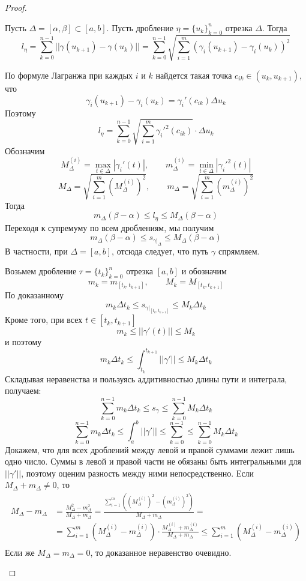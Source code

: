 \begin{proof}
	\begin{MyList}
		\item Пусть $\Delta = [\alpha, \beta] \subset [a, b]$. Пусть дробление $\eta = \{u_k\}_{k = 0}^n$ отрезка $\Delta$. 
		Тогда
		\[l_\eta = \sum_{k=0}^{n - 1} ||\gamma(u_{k + 1}) - \gamma(u_k)|| = \sum_{k=0}^{n - 1} \sqrt{\sum_{i=1}^{m} \left(\gamma_i(u_{k + 1}) - \gamma_i(u_k)\right)^2}\]  

		По формуле Лагранжа при каждых $i$ и $k$ найдется такая точка $c_{ik} \in (u_k, u_{k + 1})$, что
		\[\gamma_i (u_{k + 1}) - \gamma_i (u_k) = \gamma_i' (c_{ik}) \Delta u_k\]
		Поэтому
		\[l_\eta = \sum_{k=0}^{n - 1} \sqrt{\sum_{i=1}^{m} \gamma_i'^2 (c_{ik})} \cdot \Delta u_k\]
		Обозначим 
		\[M_\Delta^{(i)} = \max_{t \in \Delta} |\gamma_i'(t)|, \qquad m_\Delta^{(i)} = \min_{t \in \Delta} |\gamma_i'^2 (t)|\]
		\[M_\Delta = \sqrt{\sum_{i=1}^{m} \left(M_\Delta^{(i)}\right)^2}, \qquad m_\Delta = \sqrt{\sum_{i=1}^{m} \left(m_\Delta^{(i)}\right)^2}\]
		Тогда
		\[m_\Delta (\beta - \alpha) \leqslant l_\eta \leqslant M_\Delta (\beta - \alpha)\]
		Переходя к супремуму по всем дроблениям, мы получим
		\[m_\Delta (\beta - \alpha) \leqslant s_{\gamma |_\Delta} \leqslant M_\Delta (\beta - \alpha)\]
		В частности, при $\Delta = [a, b]$, отсюда следует, что путь $\gamma$ спрямляем.

		\item Возьмем дробление $\tau = \{t_k\}_{k = 0}^n$ отрезка $[a, b]$ и обозначим
		\[m_k = m_{[t_k, t_{k + 1}]}, \qquad M_k = M_{[t_k, t_{k + 1}]}\]
		По доказанному
		\[m_k \Delta t_k \leqslant s_{\gamma |_{[t_k, t_{k + 1}]}} \leqslant M_k \Delta t_k\]
		Кроме того, при всех $t \in [t_k, t_{k + 1}]$
		\[m_k \leqslant ||\gamma'(t)|| \leqslant M_k\]	
		и поэтому
		\[m_k \Delta t_k \leqslant \int_{t_k}^{t_{k + 1}} ||\gamma'|| \leqslant M_k \Delta t_k\]
		Складывая неравенства и пользуясь аддитивностью длины пути и интеграла, получаем:
		\[\sum_{k=0}^{n - 1} m_k \Delta t_k \leqslant s_\gamma \leqslant \sum_{k=0}^{n - 1} M_k \Delta t_k\]
		\[\sum_{k=0}^{n - 1} m_k \Delta t_k \leqslant \int_a^b ||\gamma'|| \leqslant \sum_{k=0}^{n - 1} \leqslant \sum_{k=0}^{n - 1} M_k \Delta t_k\]
		Докажем, что для всех дроблений между левой и правой суммами лежит лишь одно число.
		Суммы в левой и правой части не обязаны быть интегральными для $||\gamma'||$, поэтому оценим разность между ними непосредственно.
		Если $M_\Delta + m_\Delta \neq 0$, то 
		\begin{align*}
			M_\Delta - m_\Delta &= \frac{M_\Delta^2 - m_\Delta^2}{M_\Delta + m_\Delta} = \frac{\sum_{i = 1}^m \left(\left(M_\Delta^{(i)}\right)^2 - \left(m_\Delta^{(i)}\right)^2\right)}{M_\Delta + m_\Delta} = \\
			&= \sum_{i=1}^{m} \left(M_\Delta^{(i)} - m_\Delta^{(i)}\right) \cdot \frac{M_\Delta^{(i)} + m_\Delta^{(i)}}{M_\Delta + m_\Delta} \leqslant \sum_{i=1}^{m} \left(M_\Delta^{(i)} - m_\Delta^{(i)}\right) \\
		\end{align*}
		Если же $M_\Delta = m_\Delta = 0$, то доказанное неравенство очевидно.


\end{MyList}
\end{proof}
